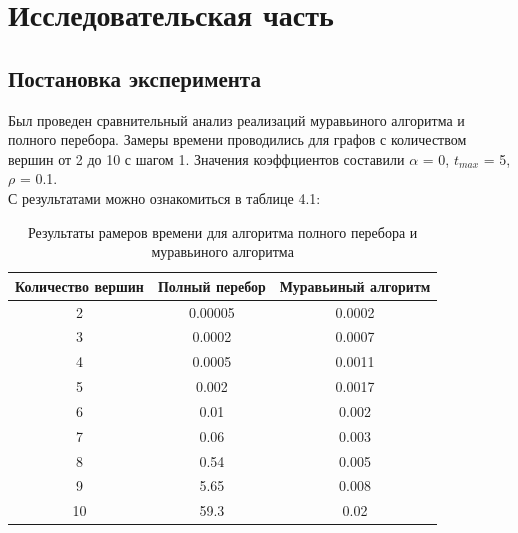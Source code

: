 \documentclass[12pt]{report}
\begin{document}
\chapter{Исследовательская часть}

\section{Постановка эксперимента}

Был проведен сравнительный анализ реализаций муравьиного алгоритма и полного перебора. Замеры времени проводились для графов с количеством вершин от 2 до 10 с шагом 1. Значения коэффциентов составили $\alpha$ = 0, $t_{max}$ = 5, $\rho$ = 0.1.\\
С результатами можно ознакомиться в таблице 4.1:\\

\begin{table}[H]
	\caption{Результаты рамеров времени для алгоритма полного перебора и муравьиного алгоритма}
	\begin{center}
		\begin{tabular}{|c|c|c|}
			\hline
			Количество вершин &Полный перебор& Муравьиный алгоритм \\\hline
			2&0.00005&0.0002\\
			3&0.0002&0.0007\\
			4&0.0005&0.0011\\
			5&0.002&0.0017\\
			6&0.01&0.002\\
			7&0.06&0.003\\
			8&0.54&0.005\\
			9&5.65&0.008\\
			10&59.3&0.02\\
			\hline
		\end{tabular}
	\end{center}
\end{table} 




\begin{center}
	\end{center}
       
\end{document}
